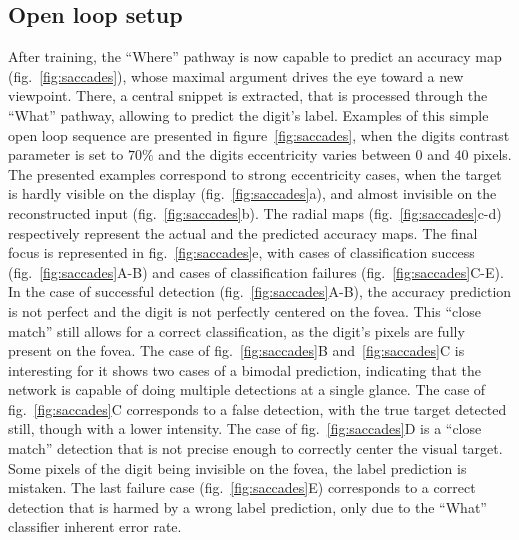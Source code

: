 \subsection{Open loop setup}
After training, the ``Where'' pathway is now capable to predict an accuracy map (fig.~\ref{fig:saccades}), whose maximal argument drives the eye toward a new viewpoint. There, a central snippet is extracted, that is processed through the ``What'' pathway, allowing to predict the digit's label. Examples of this simple open loop sequence are presented in figure~\ref{fig:saccades}, when the digits contrast parameter is set to $70\%$ and the digits eccentricity varies between $0$ and $40$ pixels. The presented examples correspond to strong eccentricity cases, when the target is hardly visible on the display (fig.~\ref{fig:saccades}a), and almost invisible on the reconstructed input (fig.~\ref{fig:saccades}b). The radial maps (fig.~\ref{fig:saccades}c-d) respectively represent the actual and the predicted accuracy maps. The final focus is represented in fig.~\ref{fig:saccades}e, with cases of classification success (fig.~\ref{fig:saccades}A-B) and cases of classification failures (fig.~\ref{fig:saccades}C-E). In the case of successful detection (fig.~\ref{fig:saccades}A-B), the accuracy prediction is not perfect and the digit is not perfectly centered on the fovea. This ``close match'' still allows for a correct classification, as the digit's pixels are fully present on the fovea. The case of fig.~\ref{fig:saccades}B and~\ref{fig:saccades}C is interesting for it shows two cases of a bimodal prediction, indicating that the network is capable of doing multiple detections at a single glance. The case of fig.~\ref{fig:saccades}C corresponds to a false detection, with the true target detected still, though with a lower intensity. The case of fig.~\ref{fig:saccades}D is a ``close match'' detection that is not precise enough to correctly center the visual target. Some pixels of the digit being invisible on the fovea, the label prediction is mistaken. The last failure case (fig.~\ref{fig:saccades}E) corresponds to a correct detection that is harmed by a wrong label prediction, only due to the ``What'' classifier inherent error rate. %


